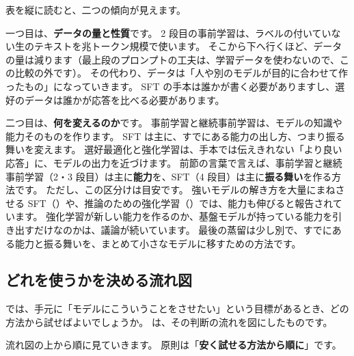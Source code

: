 表を縦に読むと、二つの傾向が見えます。

一つ目は、\textbf{データの量と性質}です。
2 段目の事前学習は、ラベルの付いていない生のテキストを兆トークン規模で使います。
そこから下へ行くほど、データの量は減ります（最上段のプロンプトの工夫は、学習データを使わないので、この比較の外です）。
その代わり、データは「人や別のモデルが目的に合わせて作ったもの」になっていきます。
SFT の手本は誰かが書く必要がありますし、選好のデータは誰かが応答を比べる必要があります。

二つ目は、\textbf{何を変えるのか}です。
事前学習と継続事前学習は、モデルの知識や能力そのものを作ります。
SFT は主に、すでにある能力の出し方、つまり振る舞いを変えます。
選好最適化と強化学習は、手本では伝えきれない「より良い応答」に、モデルの出力を近づけます。
前節の言葉で言えば、事前学習と継続事前学習（2・3 段目）は主に\textbf{能力}を、SFT（4 段目）は主に\textbf{振る舞い}を作る方法です。
ただし、この区分けは目安です。
強いモデルの解き方を大量にまねさせる SFT（）や、推論のための強化学習（）では、能力も伸びると報告されています。
強化学習が新しい能力を作るのか、基盤モデルが持っている能力を引き出すだけなのかは、議論が続いています\cite{yue2025does}。
最後の蒸留は少し別で、すでにある能力と振る舞いを、まとめて小さなモデルに移すための方法です。

\subsection{どれを使うかを決める流れ図}

では、手元に「モデルにこういうことをさせたい」という目標があるとき、どの方法から試せばよいでしょうか。
は、その判断の流れを図にしたものです。

流れ図の上から順に見ていきます。
原則は「\textbf{安く試せる方法から順に}」です。

